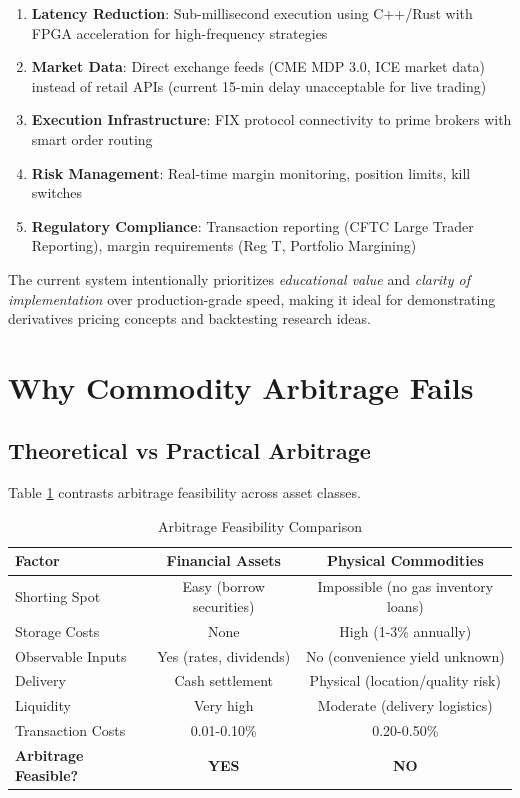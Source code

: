 \documentclass[12pt,a4paper]{article}
\begin{document}
\begin{enumerate}
    \item \textbf{Latency Reduction}: Sub-millisecond execution using C++/Rust with FPGA acceleration for high-frequency strategies
    \item \textbf{Market Data}: Direct exchange feeds (CME MDP 3.0, ICE market data) instead of retail APIs (current 15-min delay unacceptable for live trading)
    \item \textbf{Execution Infrastructure}: FIX protocol connectivity to prime brokers with smart order routing
    \item \textbf{Risk Management}: Real-time margin monitoring, position limits, kill switches
    \item \textbf{Regulatory Compliance}: Transaction reporting (CFTC Large Trader Reporting), margin requirements (Reg T, Portfolio Margining)
\end{enumerate}

The current system intentionally prioritizes \textit{educational value} and \textit{clarity of implementation} over production-grade speed, making it ideal for demonstrating derivatives pricing concepts and backtesting research ideas.

\newpage
\section{Why Commodity Arbitrage Fails}

\subsection{Theoretical vs Practical Arbitrage}

Table \ref{tab:arbitrage_comparison} contrasts arbitrage feasibility across asset classes.

\begin{table}[H]
\centering
\caption{Arbitrage Feasibility Comparison}
\label{tab:arbitrage_comparison}
\begin{tabular}{@{}lcc@{}}
\toprule
\textbf{Factor} & \textbf{Financial Assets} & \textbf{Physical Commodities} \\
\midrule
Shorting Spot & Easy (borrow securities) & Impossible (no gas inventory loans) \\
Storage Costs & None & High (1-3\% annually) \\
Observable Inputs & Yes (rates, dividends) & No (convenience yield unknown) \\
Delivery & Cash settlement & Physical (location/quality risk) \\
Liquidity & Very high & Moderate (delivery logistics) \\
Transaction Costs & 0.01-0.10\% & 0.20-0.50\% \\
\midrule
\textbf{Arbitrage Feasible?} & \textbf{YES} & \textbf{NO} \\
\bottomrule
\end{tabular}
\end{table}
\end{document}
